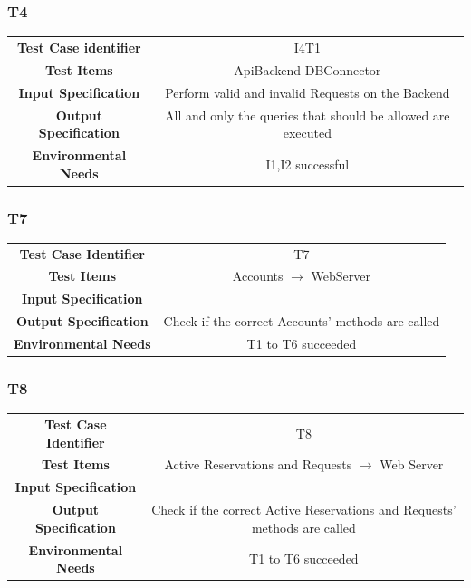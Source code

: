 \documentclass{article}
\begin{document}
\subsubsection{T4}
\begin{adjustbox}{width=1.2\textwidth}	
	\begin{tabular}{*{2}{c}}
		\toprule
		\textbf{Test Case identifier} & I4T1\\
		\textbf{Test Items} & ApiBackend \rightarrow DBConnector\\
		\textbf{Input Specification} & Perform valid and invalid Requests on the Backend\\
		\textbf{Output Specification} & All and only the queries that should be allowed are executed\\
		\textbf{Environmental Needs} & I1,I2 successful\\
		\bottomrule
	\end{tabular}
\end{adjustbox}

\subsubsection{T7}
\begin{adjustbox}{width=1.2\textwidth}	
	\begin{tabular}{*{2}{c}}
		\midrule
		\textbf{Test Case Identifier} & T7\\
		\textbf{Test Items} & Accounts $\rightarrow$ WebServer\\
		\textbf{Input Specification} & \\ %
		\textbf{Output Specification} & Check if the correct Accounts' methods are called\\
		\textbf{Environmental Needs} & T1 to T6 succeeded\\
		\bottomrule
	\end{tabular}
\end{adjustbox}
\subsubsection{T8}
\begin{adjustbox}{width=1.2\textwidth}	
	\begin{tabular}{*{2}{c}}
		\midrule
		\textbf{Test Case Identifier} & T8\\
		\textbf{Test Items} & Active Reservations and Requests $\rightarrow$ Web Server\\
		\textbf{Input Specification} & \\ %
		\textbf{Output Specification} & Check if the correct Active Reservations and Requests' methods are called\\
		\textbf{Environmental Needs} & T1 to T6 succeeded\\
		\bottomrule
	\end{tabular}
\end{adjustbox}
\end{document}
